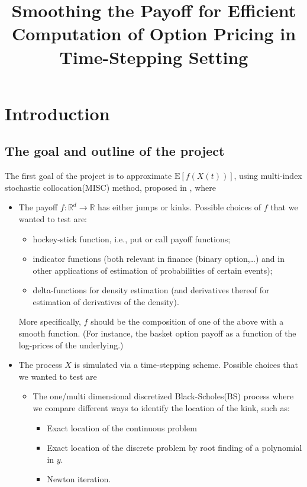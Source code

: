 \documentclass[11pt]{article}
\title{ Smoothing  the  Payoff for  Efficient Computation of Option Pricing in
  Time-Stepping Setting}
\date{ }
\newcommand{\expt}[1]{\mathrm{E}\left[#1\right]}
\newcommand{\rset}{\mathbb{R}}
\begin{document}
\maketitle
\section{Introduction}
\subsection{The goal and outline of the project}
The first goal of the project is to approximate $\expt{f(X(t))}$, using multi-index stochastic collocation(MISC) method, proposed in \cite{haji2016multi},  where 

\begin{itemize}
	\item The payoff $f:\rset^d \rightarrow \rset$ has either jumps or kinks. Possible choices of $f$ that we wanted to test are:
	
	\begin{itemize}
		\item hockey-stick function, i.e., put or call payoff functions;
		\item indicator functions (both relevant in finance (binary option,\dots) and in other applications of estimation of probabilities of certain events);
		\item delta-functions for density estimation (and derivatives thereof for	estimation of derivatives of the density).
	\end{itemize}
	More specifically, $f$ should be the composition of one of the above with a smooth function. (For instance, the basket option payoff as a function of the log-prices of the underlying.)
	\item The process $X$ is simulated via a time-stepping scheme. Possible choices that we wanted to test are
		\begin{itemize}
		\item The one/multi dimensional discretized Black-Scholes(BS) process where we compare
		different ways to identify the location of the kink, such as:
		\begin{itemize}
			\item Exact location of the continuous problem
			\item  Exact location of the discrete problem by root  finding of a polynomial in $y$.
			\item Newton iteration.
		\end{itemize}


\end{itemize}
\end{itemize}
\end{document}
